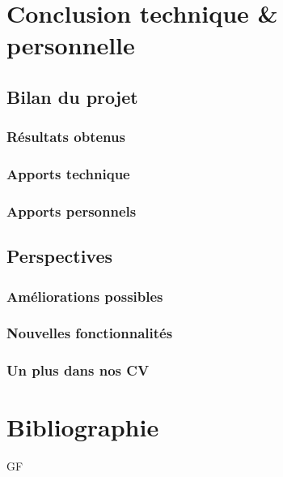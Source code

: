 \documentclass[12pt]{report}
\begin{document}
\section{Conclusion technique \& personnelle}
\subsection{Bilan du projet}
\subsubsection{Résultats obtenus}
\subsubsection{Apports technique}
\subsubsection{Apports personnels}

\subsection{Perspectives}
\subsubsection{Améliorations possibles}
\subsubsection{Nouvelles fonctionnalités}
\subsubsection{Un plus dans nos CV}

\section{Bibliographie}

GF\label{GF}
\end{document}
